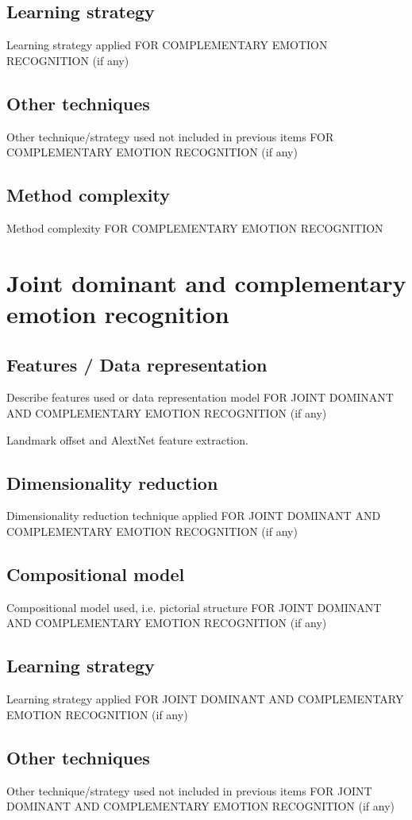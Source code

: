 \documentclass{article}
\begin{document}
\subsection{Learning strategy}
Learning strategy applied FOR COMPLEMENTARY EMOTION RECOGNITION (if any)

\subsection{Other techniques}
Other technique/strategy used not included in previous items FOR COMPLEMENTARY EMOTION RECOGNITION (if any)

\subsection{Method complexity}
Method complexity FOR COMPLEMENTARY EMOTION RECOGNITION


\section{Joint dominant and complementary emotion recognition}
\subsection{Features / Data representation}
Describe features used or data representation model FOR JOINT DOMINANT AND COMPLEMENTARY EMOTION RECOGNITION (if any)

Landmark offset and AlextNet feature extraction.
\subsection{Dimensionality reduction}
Dimensionality reduction technique applied FOR JOINT DOMINANT AND COMPLEMENTARY EMOTION RECOGNITION (if any)

\subsection{Compositional model}
Compositional model used, i.e. pictorial structure FOR JOINT DOMINANT AND COMPLEMENTARY EMOTION RECOGNITION (if any)

\subsection{Learning strategy}
Learning strategy applied FOR JOINT DOMINANT AND COMPLEMENTARY EMOTION RECOGNITION (if any)

\subsection{Other techniques}
Other technique/strategy used not included in previous items FOR JOINT DOMINANT AND COMPLEMENTARY EMOTION RECOGNITION (if any)
\end{document}
